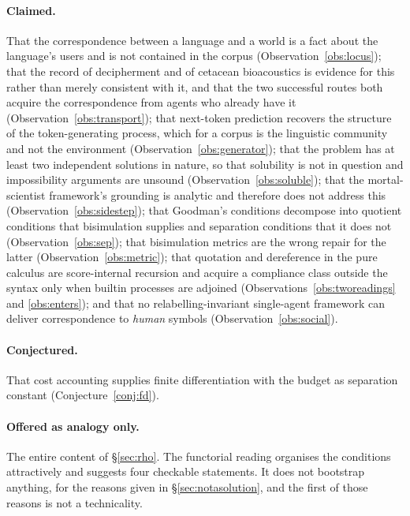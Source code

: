 \documentclass[11pt,a4paper]{article}
\theoremstyle{definition}
\theoremstyle{plain}
\theoremstyle{remark}
\begin{document}
\paragraph{Claimed.} That the correspondence between a language and a world is a fact
about the language's users and is not contained in the corpus
(Observation~\ref{obs:locus}); that the record of decipherment and of cetacean
bioacoustics is evidence for this rather than merely consistent with it, and that the two
successful routes both acquire the correspondence from agents who already have it
(Observation~\ref{obs:transport}); that next-token
prediction recovers the structure of the token-generating process, which for a corpus is
the linguistic community and not the environment (Observation~\ref{obs:generator}); that
the problem has at least two independent solutions in nature, so that solubility is not in
question and impossibility arguments are unsound (Observation~\ref{obs:soluble}); that
the mortal-scientist framework's grounding is analytic and therefore does not address this
(Observation~\ref{obs:sidestep}); that Goodman's conditions decompose into quotient
conditions that bisimulation supplies and separation conditions that it does not
(Observation~\ref{obs:sep}); that bisimulation metrics are the wrong repair for the latter
(Observation~\ref{obs:metric}); that quotation and dereference in the pure calculus are
score-internal recursion and acquire a compliance class outside the syntax only when
builtin processes are adjoined (Observations~\ref{obs:tworeadings} and \ref{obs:enters});
and that no relabelling-invariant single-agent framework
can deliver correspondence to \emph{human} symbols (Observation~\ref{obs:social}).

\paragraph{Conjectured.} That cost accounting supplies finite differentiation with the
budget as separation constant (Conjecture~\ref{conj:fd}).

\paragraph{Offered as analogy only.} The entire content of \S\ref{sec:rho}. The functorial
reading organises the conditions attractively and suggests four checkable statements. It
does not bootstrap anything, for the reasons given in \S\ref{sec:notasolution}, and the
first of those reasons is not a technicality.
\end{document}
